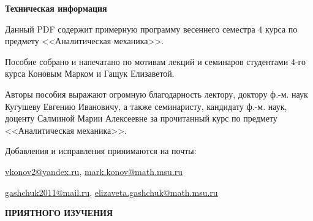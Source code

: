 
\begin{center}
{\Large \textbf{Техническая информация}}
\end{center}

\bigskip
Данный PDF содержит примерную программу весеннего семестра 4 курса по предмету <<Аналитическая механика>>.

\bigskip
Пособие собрано и напечатано по мотивам лекций и семинаров студентами 4-го курса Коновым Марком и Гащук Елизаветой.

\bigskip
\begin{sloppypar}
Авторы пособия выражают огромную благодарность лектору, доктору ф.-м. наук Кугушеву Евгению Ивановичу, а также семинаристу, кандидату ф.-м. наук, доценту Салминой Марии Алексеевне за прочитанный курс по предмету <<Аналитическая механика>>.
\end{sloppypar}

\bigskip
Добавления и исправления принимаются на почты:
\begin{center}
\url{vkonov2@yandex.ru}, \url{mark.konov@math.msu.ru}

\url{gashchuk2011@mail.ru}, \url{elizaveta.gashchuk@math.msu.ru}
\end{center}

\bigskip
\begin{center}
{\Large \textbf{ПРИЯТНОГО ИЗУЧЕНИЯ}}
\end{center}

\newpage

